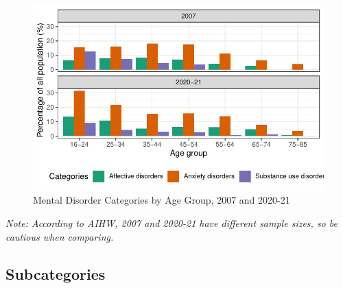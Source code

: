 \documentclass[
  a4paper,
  DIV=11,
  numbers=noendperiod]{scrreport}
\begin{document}
\begin{figure}

\caption{\label{fig-12a}Mental Disorder Categories by Age Group, 2007
and 2020-21}

{\centering \includegraphics{./chap1-prevalence-of-md_files/figure-pdf/fig-12a-1.pdf}

}

\end{figure}

\emph{Note: According to AIHW, 2007 and 2020-21 have different sample
sizes, so be cautious when comparing.}

\hypertarget{subcategories}{%
\subsection{Subcategories}\label{subcategories}}
\end{document}
